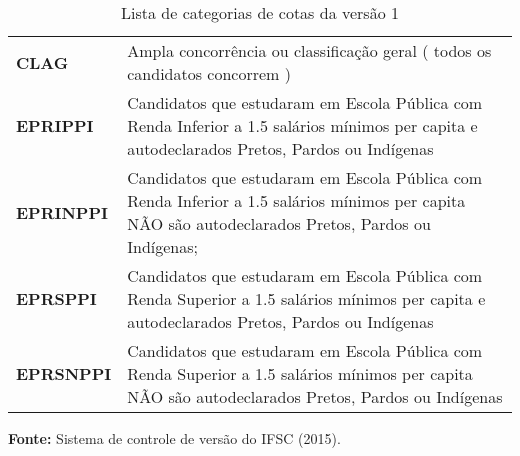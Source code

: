 \begin{table}
\caption{Lista de categorias de cotas da versão 1}
\label{tabela_categoriasv1}
\centering
\begin{tabular}{ l l }
   \cline{1-1}\cline{2-2}  
    \multicolumn{1}{|p{5.850cm}|}{\textbf{CLAG}} &
    \multicolumn{1}{p{8.217cm}|}{Ampla concorrência ou classificação geral 
( todos os candidatos concorrem )}
  \\ 
   \cline{1-1}\cline{2-2}  
    \multicolumn{1}{|p{5.850cm}|}{\textbf{EPRIPPI}} &
    \multicolumn{1}{p{8.217cm}|}{Candidatos que estudaram em Escola Pública com Renda Inferior a 1.5 salários mínimos per capita e autodeclarados Pretos, Pardos ou Indígenas}
  \\    
   \cline{1-1}\cline{2-2}  
    \multicolumn{1}{|p{5.850cm}|}{\textbf{EPRINPPI}} &
    \multicolumn{1}{p{8.217cm}|}{Candidatos que estudaram em Escola Pública com Renda Inferior a 1.5 salários mínimos per capita NÃO são autodeclarados Pretos, Pardos ou Indígenas; }
  \\    
   \cline{1-1}\cline{2-2}  
    \multicolumn{1}{|p{5.850cm}|}{\textbf{EPRSPPI}} &
    \multicolumn{1}{p{8.217cm}|}{Candidatos que estudaram em Escola Pública com Renda Superior a 1.5 salários mínimos per capita e autodeclarados Pretos, Pardos ou Indígenas}
  \\     
   \cline{1-1}\cline{2-2}  
    \multicolumn{1}{|p{5.850cm}|}{\textbf{EPRSNPPI}} &
    \multicolumn{1}{p{8.217cm}|}{Candidatos que estudaram em Escola Pública com Renda Superior a 1.5 salários mínimos per capita NÃO são autodeclarados Pretos, Pardos ou Indígenas}
  \\       
  \hline

 \end{tabular} 
  \par\medskip\textbf{Fonte:} Sistema de controle de versão do IFSC (2015). \par\medskip
\end{table}
